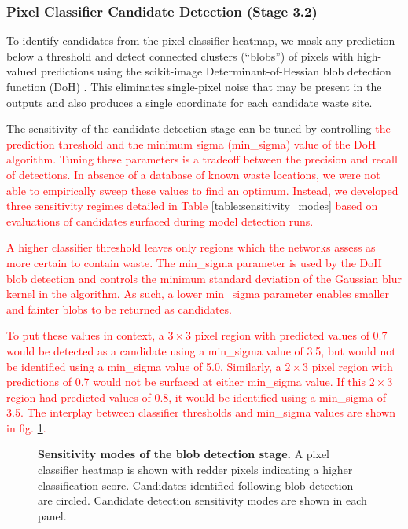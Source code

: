 \documentclass[10pt,letterpaper]{article}
\begin{document}
\subsubsection*{Pixel Classifier Candidate Detection (Stage 3.2)}
To identify candidates from the pixel classifier heatmap, we mask any prediction below a threshold and detect connected clusters (“blobs”) of pixels with high-valued predictions using the scikit-image Determinant-of-Hessian blob detection function (DoH) \cite{van2014scikit}. This eliminates single-pixel noise that may be present in the outputs and also produces a single coordinate for each candidate waste site. 

The sensitivity of the candidate detection stage can be tuned by controlling \textcolor{red}{the prediction threshold and the minimum sigma (min\_sigma) value of the DoH algorithm. Tuning these parameters is a tradeoff between the precision and recall of detections. In absence of a database of known waste locations, we were not able to empirically sweep these values to find an optimum. Instead, we developed three sensitivity regimes detailed in Table \ref{table:sensitivity_modes} based on evaluations of candidates surfaced during model detection runs.}
 
\textcolor{red}{A higher classifier threshold leaves only regions which the networks assess as more certain to contain waste. The min\_sigma parameter is used by the DoH blob detection and controls the minimum standard deviation of the Gaussian blur kernel in the algorithm. As such, a lower min\_sigma parameter enables smaller and fainter blobs to be returned as candidates.}
 
\textcolor{red}{To put these values in context, a $3\times3$ pixel region with predicted values of 0.7 would be detected as a candidate using a min\_sigma value of 3.5, but would not be identified using a min\_sigma value of 5.0. Similarly, a $2\times3$ pixel region with predictions of 0.7 would not be surfaced at either min\_sigma value.  If this $2\times3$ region had predicted values of 0.8, it would be identified using a min\_sigma of 3.5. The interplay between classifier thresholds and min\_sigma values are shown in fig. \ref{fig:blob_detection}.}


\begin{figure}[!h]
    \caption{{\bf Sensitivity modes of the blob detection stage.}
    A pixel classifier heatmap is shown with redder pixels indicating a higher classification score. Candidates identified following blob detection are circled. Candidate detection sensitivity modes are shown in each panel.}
    \label{fig:blob_detection}
\end{figure}
\end{document}
